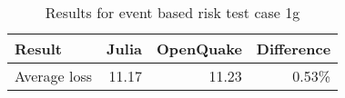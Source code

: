 \begin{table}[htbp]

\centering
\begin{tabular}{ l r r r }

\hline
\rowcolor{anti-flashwhite}
\bf{Result} & \bf{Julia} & \bf{OpenQuake} & \bf{Difference}\\
\hline
Average loss & 11.17 & 11.23 & 0.53\% \\
\hline
\end{tabular}

\caption{Results for event based risk test case 1g}
\label{tab:result-ebr-1g}
\end{table}